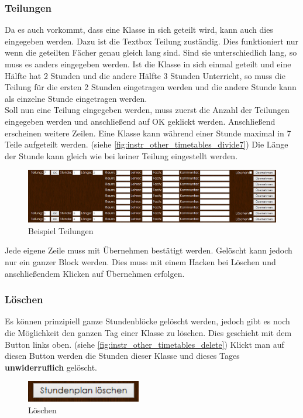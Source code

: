 \subsubsection{Teilungen}
Da es auch vorkommt, dass eine Klasse in sich geteilt wird, kann auch dies eingegeben werden. Dazu ist die Textbox Teilung zuständig. Dies funktioniert nur wenn die geteilten Fächer genau gleich lang sind. Sind sie unterschiedlich lang, so muss es anders eingegeben werden. Ist die Klasse in sich einmal geteilt und eine Hälfte hat 2 Stunden und die andere Hälfte 3 Stunden Unterricht, so muss die Teilung für die ersten 2 Stunden eingetragen werden und die andere Stunde kann als einzelne Stunde eingetragen werden.\\
Soll nun eine Teilung eingegeben werden, muss zuerst die Anzahl der Teilungen eingegeben werden und anschließend auf OK geklickt werden. Anschließend erscheinen weitere Zeilen. Eine Klasse kann während einer Stunde maximal in 7 Teile aufgeteilt werden. (siehe \autoref{fig:instr_other_timetables_divide7}) Die Länge der Stunde kann gleich wie bei keiner Teilung eingestellt werden.
\begin{figure}[H]
\centering
\includegraphics[keepaspectratio=true, width=17cm]{images/screenshots/timetables_input_divide7.png}
\caption{Beispiel Teilungen}
\label{fig:instr_other_timetables_divide7}
\end{figure}
Jede eigene Zeile muss mit Übernehmen bestätigt werden. Gelöscht kann jedoch nur ein ganzer Block werden. Dies muss mit einem Hacken bei Löschen und anschließendem Klicken auf Übernehmen erfolgen.
\subsubsection{Löschen}
Es können prinzipiell ganze Stundenblöcke gelöscht werden, jedoch gibt es noch die Möglichkeit den ganzen Tag einer Klasse zu löschen. Dies geschieht mit dem Button links oben. (siehe \autoref{fig:instr_other_timetables_delete}) Klickt man auf diesen Button werden die Stunden dieser Klasse und dieses Tages \textbf{unwiderruflich} gelöscht.
\begin{figure}[H]
\centering
\includegraphics[keepaspectratio=true, width=5cm]{images/screenshots/timetables_input_delete.png}
\caption{Löschen}
\label{fig:instr_other_timetables_delete}
\end{figure}
